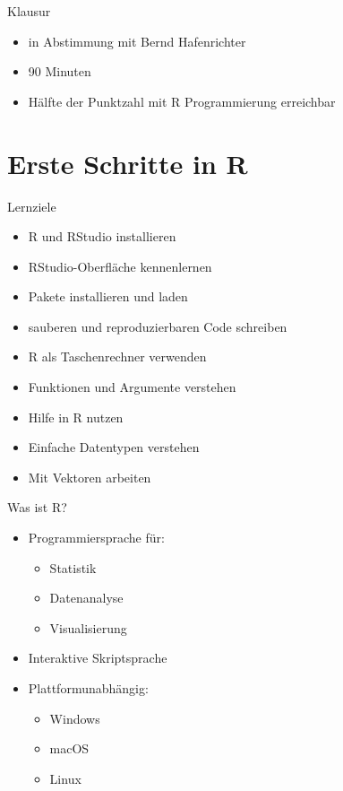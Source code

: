 \documentclass[
  10pt,
  ignorenonframetext,
  aspectratio=169,
]{beamer}
\providecommand{\tightlist}{%
  \setlength{\itemsep}{0pt}\setlength{\parskip}{0pt}}
\begin{document}
\begin{frame}{Klausur}
\label{klausur}
\begin{itemize}
\tightlist
\item
  in Abstimmung mit Bernd Hafenrichter
\item
  90 Minuten
\item
  Hälfte der Punktzahl mit R Programmierung erreichbar
\end{itemize}
\end{frame}

\section{Erste Schritte in R}\label{erste-schritte-in-r}

\begin{frame}{Lernziele}
\label{lernziele}
\begin{itemize}
\tightlist
\item
  R und RStudio installieren
\item
  RStudio-Oberfläche kennenlernen
\item
  Pakete installieren und laden
\item
  sauberen und reproduzierbaren Code schreiben
\item
  R als Taschenrechner verwenden
\item
  Funktionen und Argumente verstehen
\item
  Hilfe in R nutzen
\item
  Einfache Datentypen verstehen
\item
  Mit Vektoren arbeiten
\end{itemize}
\end{frame}

\begin{frame}{Was ist R?}
\label{was-ist-r}
\begin{itemize}
\tightlist
\item
  Programmiersprache für:

  \begin{itemize}
  \tightlist
  \item
    Statistik
  \item
    Datenanalyse
  \item
    Visualisierung
  \end{itemize}
\item
  Interaktive Skriptsprache
\item
  Plattformunabhängig:

  \begin{itemize}
  \tightlist
  \item
    Windows
  \item
    macOS
  \item
    Linux
  \end{itemize}
\end{itemize}
\end{frame}
\end{document}
